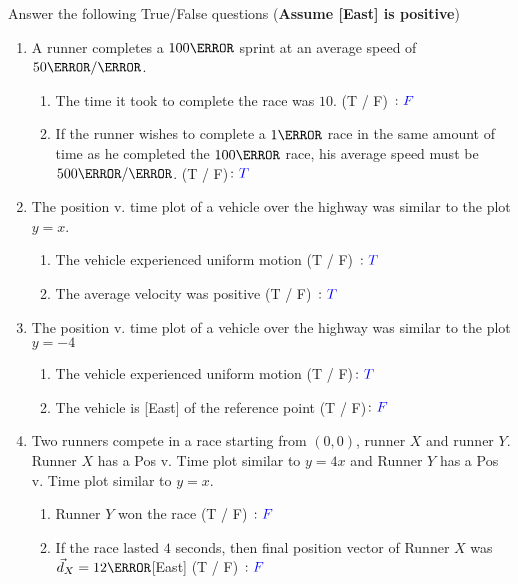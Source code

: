 \documentclass[12pt]{article} %
\begin{document}
\begin{qstn}[1] %
    Answer the following True/False questions (\textbf{Assume [East] is positive})
    \begin{enumerate}
        \item A runner completes a $100\m$ sprint at an average speed of $50 \m / \s$.
        \begin{enumerate}[label = (\alph*)]
            \item The time it took to complete the race was $10$\s. (T / F) $\colon \textcolor{blue}{F}$
            \item If the runner wishes to complete a $1\km$ race in the same amount of time as he completed the $100\m$ race, his average speed must be $500 \m / \s$. (T / F)$\colon \textcolor{blue}{T}$
        \end{enumerate}
        \item The position v. time plot of a vehicle over the highway was similar to the plot $y = x$.
        \begin{enumerate}[label = (\alph*)]
            \item The vehicle experienced uniform motion (T / F) $\colon \textcolor{blue}{T}$
            \item The average velocity was positive (T / F) $\colon \textcolor{blue}{T}$
        \end{enumerate}
        \item The position v. time plot of a vehicle over the highway was similar to the plot $y = -4$
        \begin{enumerate}[label = (\alph*)]
            \item The vehicle experienced uniform motion (T / F)$\colon \textcolor{blue}{T}$
            \item The vehicle is [East] of the reference point (T / F)$\colon \textcolor{blue}{F}$
        \end{enumerate}
        \item Two runners compete in a race starting from $(0,0)$, runner $X$ and runner $Y$. Runner $X$ has a Pos v. Time plot similar to $y = 4x$ and Runner $Y$ has a Pos v. Time plot similar to $y = x$.
        \begin{enumerate}[label = (\alph*)]
            \item Runner $Y$ won the race (T / F) $\colon \textcolor{blue}{F}$
            \item If the race lasted $4$ seconds, then final position vector of Runner $X$ was $\vec d_X = 12\m$[East] (T / F) $\colon \textcolor{blue}{F}$
        \end{enumerate}

    \end{enumerate}

 \end{qstn}
\end{document}
